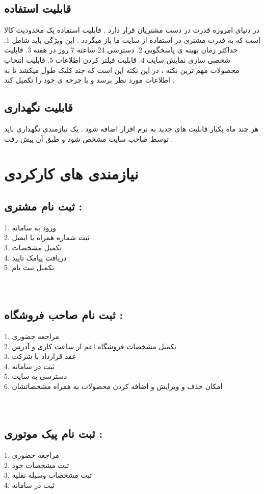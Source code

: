 \documentclass[12pt,onecolumn,a4paper]{article}
\begin{document}
\subsection{قابلیت استفاده}
در دنیای امروزه قدرت در دست مشتریان قرار دارد . قابلیت استفاده یک محدودیت کالا است که به قدرت مشتری در استفاده از سایت ما باز میگردد . این ویژگی باید شامل
1.	حداکثر زمان بهینه ی پاسخگویی
2.	دسترسی 24 ساعته 7 روز در هفته
3.	قابلیت شخصی سازی نمایش سایت
4.	قابلیت فیلتر کردن اطلاعات
5.	قابلیت انتخاب محصولات
مهم ترین نکته ، در این نکته این است که چند کلیک طول میکشد تا به اطلاعات مورد نظر برسد و یا چرخه ی خود را تکمیل کند .

\subsection{قابلیت نگهداری}
هر چند ماه یکبار قابلیت های جدید به نرم افزار اضافه شود . یک نیازمندی نگهداری باید توسط صاحب سایت مشخص شود و طبق آن پیش رفت .


\section{نیازمندی های کارکردی}
\subsection{ثبت نام مشتری :}
1. ورود به سامانه\\
2. ثبت شماره همراه یا ایمیل \\
3. تکمیل مشخصات\\
4. دریافت پیامک تایید \\
5. تکمیل ثبت نام\\
\\
\\
\subsection{
ثبت نام صاحب فروشگاه  :
}
1. مراجعه حضوری\\
2. تکمیل مشخصات فروشگاه اعم از ساعت کاری و آدرس\\
3. عقد قرارداد با شرکت\\
4. ثبت در سامانه\\
5. دسترسی به سایت \\
6. امکان حذف و ویرایش و اضافه کردن محصولات به همراه مشخصاتشان\\
\\
\\

\subsection{
ثبت نام پیک موتوری  :
}
1. مراجعه حضوری\\
2. ثبت مشخصات خود\\
3. ثبت مشخصات وسیله نقلیه\\
4. ثبت در سامانه\\
\end{document}
